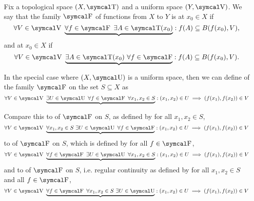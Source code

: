 \begin{definition}\label{def:function_set_continuity}\cite[285]{Bouziad2004}
  Fix a topological space \( (X, \CT) \) and a uniform space \( (Y, \CV) \). We say that the family \( \CF \) of functions from \( X \) to \( Y \) is  at \( x_0 \in X \) if
  \begin{equation}\label{def:function_set_continuity/functionwise}
    \forall V \in \CV \ \underbrace{\forall f \in \CF \ \exists A \in \CT(x_0)} : f(A) \subseteq B(f(x_0), V),
  \end{equation}
  and  at \( x_0 \in X \) if
  \begin{equation}\label{def:function_set_continuity/equicontinuous}
    \forall V \in \CV \ \underbrace{\exists A \in \CT(x_0) \ \forall f \in \CF} : f(A) \subseteq B(f(x_0), V).
  \end{equation}

  In the special case where \( (X, \CU) \) is a uniform space, then we can define  of the family \( \CF \) on the set \( S \subseteq X \) as
  \begin{equation}\label{def:function_set_continuity/uniform_equicontinuous}
    \forall V \in \CV \ \underbrace{\exists U \in \CU \ \forall f \in \CF \ \forall x_1, x_2 \in S} : (x_1, x_2) \in U \implies (f(x_1), f(x_2)) \in V
  \end{equation}

  Compare this to  of \( \CF \) on \( S \), as defined by  for all \( x_1, x_2 \in S \),
  \begin{equation}\label{def:function_set_continuity/pointwise_equicontinuous}
    \forall V \in \CV \ \underbrace{\forall x_1, x_2 \in S \ \exists U \in \CU \ \forall f \in \CF} : (x_1, x_2) \in U \implies (f(x_1), f(x_2)) \in V
  \end{equation}
  to  of \( \CF \) on \( S \), which is defined by  for all \( f \in \CF \),
  \begin{equation}\label{def:function_set_continuity/uniform_functionwise}
    \forall V \in \CV \ \underbrace{\forall f \in \CF \ \exists U \in \CU \ \forall x_1, x_2 \in S} : (x_1, x_2) \in U \implies (f(x_1), f(x_2)) \in V
  \end{equation}
  and to  of \( \CF \) on \( S \), i.e. regular continuity as defined by  for all \( x_1, x_2 \in S \) and all \( f \in \CF \),
  \begin{equation}\label{def:function_set_continuity/functionwise_pointwise}
    \forall V \in \CV \ \underbrace{\forall f \in \CF \ \forall x_1, x_2 \in S \ \exists U \in \CU} : (x_1, x_2) \in U \implies (f(x_1), f(x_2)) \in V
  \end{equation}
\end{definition}

